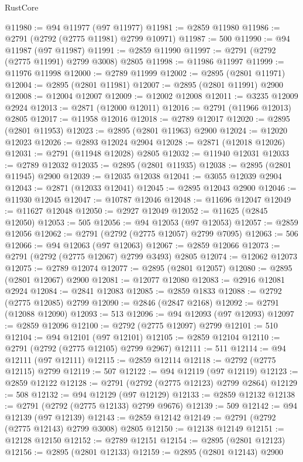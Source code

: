 \begin{lexlean}{RustCore}
\begin{coremodule}
@11980 := @94 @11977 (@97 @11977)
@11981 := @2859 @11980
@11986 := @2791 (@2792 (@2775 @11981) @2799 @10971)
@11987 := 500
@11990 := @94 @11987 (@97 @11987)
@11991 := @2859 @11990
@11997 := @2791 (@2792 (@2775 @11991) @2799 @3008) @2805
@11998 := @11986 @11997
@11999 := @11976 @11998
@12000 := @2789 @11999
@12002 := @2895 (@2801 @11971)
@12004 := @2895 (@2801 @11981)
@12007 := @2895 (@2801 @11991) @2900
@12008 := @12004 @12007
@12009 := @12002 @12008
@12011 := @3235 @12009 @2924
@12013 := @2871 (@12000 @12011)
@12016 := @2791 (@11966 @12013) @2805
@12017 := @11958 @12016
@12018 := @2789 @12017
@12020 := @2895 (@2801 @11953)
@12023 := @2895 (@2801 @11963) @2900
@12024 := @12020 @12023
@12026 := @2893 @12024 @2904
@12028 := @2871 (@12018 @12026)
@12031 := @2791 (@11948 @12028) @2805
@12032 := @11940 @12031
@12033 := @2789 @12032
@12035 := @2895 (@2801 @11935)
@12038 := @2895 (@2801 @11945) @2900
@12039 := @12035 @12038
@12041 := @3055 @12039 @2904
@12043 := @2871 (@12033 @12041)
@12045 := @2895 @12043 @2900
@12046 := @11930 @12045
@12047 := @10787 @12046
@12048 := @11696 @12047
@12049 := @11627 @12048
@12050 := @2927 @12049
@12052 := @11625 (@2845 @12050)
@12053 := 505
@12056 := @94 @12053 (@97 @12053)
@12057 := @2859 @12056
@12062 := @2791 (@2792 (@2775 @12057) @2799 @7095)
@12063 := 506
@12066 := @94 @12063 (@97 @12063)
@12067 := @2859 @12066
@12073 := @2791 (@2792 (@2775 @12067) @2799 @3493) @2805
@12074 := @12062 @12073
@12075 := @2789 @12074
@12077 := @2895 (@2801 @12057)
@12080 := @2895 (@2801 @12067) @2900
@12081 := @12077 @12080
@12083 := @2916 @12081 @2924
@12084 := @2841 @12083
@12085 := @2859 @1833
@12088 := @2792 (@2775 @12085) @2799
@12090 := @2846 (@2847 @2168)
@12092 := @2791 (@12088 @12090)
@12093 := 513
@12096 := @94 @12093 (@97 @12093)
@12097 := @2859 @12096
@12100 := @2792 (@2775 @12097) @2799
@12101 := 510
@12104 := @94 @12101 (@97 @12101)
@12105 := @2859 @12104
@12110 := @2791 (@2792 (@2775 @12105) @2799 @2967)
@12111 := 511
@12114 := @94 @12111 (@97 @12111)
@12115 := @2859 @12114
@12118 := @2792 (@2775 @12115) @2799
@12119 := 507
@12122 := @94 @12119 (@97 @12119)
@12123 := @2859 @12122
@12128 := @2791 (@2792 (@2775 @12123) @2799 @2864)
@12129 := 508
@12132 := @94 @12129 (@97 @12129)
@12133 := @2859 @12132
@12138 := @2791 (@2792 (@2775 @12133) @2799 @9676)
@12139 := 509
@12142 := @94 @12139 (@97 @12139)
@12143 := @2859 @12142
@12149 := @2791 (@2792 (@2775 @12143) @2799 @3008) @2805
@12150 := @12138 @12149
@12151 := @12128 @12150
@12152 := @2789 @12151
@12154 := @2895 (@2801 @12123)
@12156 := @2895 (@2801 @12133)
@12159 := @2895 (@2801 @12143) @2900

\end{coremodule}
\end{lexlean}
